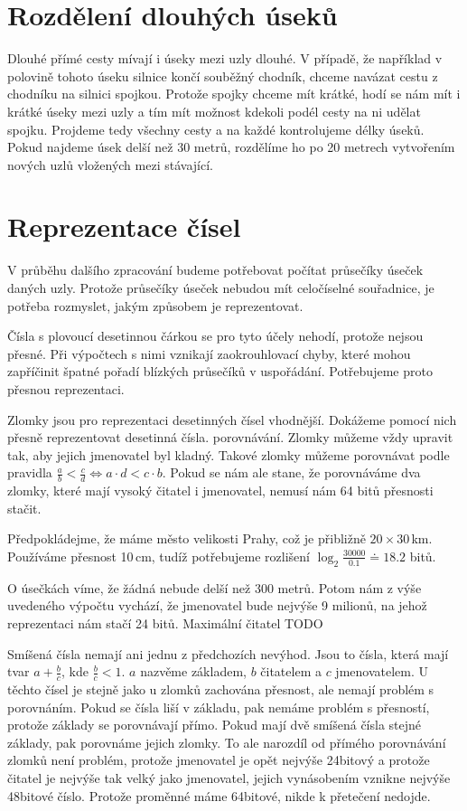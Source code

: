 \section{Rozdělení dlouhých úseků}
Dlouhé přímé cesty mívají i úseky mezi uzly dlouhé. V případě, že například v
polovině tohoto úseku silnice končí souběžný chodník, chceme navázat cestu z
chodníku na silnici spojkou. Protože spojky chceme mít krátké, hodí se nám mít i
krátké úseky mezi uzly a tím mít možnost kdekoli podél cesty na ni udělat
spojku. Projdeme tedy všechny cesty a na každé kontrolujeme délky úseků. Pokud
najdeme úsek delší než 30 metrů, rozdělíme ho po 20 metrech vytvořením nových
uzlů vložených mezi stávající.

\section{Reprezentace čísel}
V průběhu dalšího zpracování budeme potřebovat počítat průsečíky úseček daných
uzly. Protože průsečíky úseček nebudou mít celočíselné souřadnice, je potřeba
rozmyslet, jakým způsobem je reprezentovat.

{\tuc Čísla s plovoucí desetinnou čárkou} se pro tyto účely nehodí, protože
nejsou přesné. Při výpočtech s nimi vznikají zaokrouhlovací chyby, které mohou
zapříčinit špatné pořadí blízkých průsečíků v uspořádání. Potřebujeme proto
přesnou reprezentaci.

{\tuc Zlomky} jsou pro reprezentaci desetinných čísel vhodnější. Dokážeme pomocí
nich přesně reprezentovat desetinná čísla.  porovnávání. Zlomky můžeme vždy
upravit tak, aby jejich jmenovatel byl kladný.  Takové zlomky můžeme porovnávat
podle pravidla $\frac{a}{b} < \frac{c}{d} \Leftrightarrow a\cdot d < c\cdot b $. 
Pokud se nám ale stane, že porovnáváme dva zlomky, které mají vysoký čitatel i
jmenovatel, nemusí nám 64 bitů přesnosti stačit.


Předpokládejme, že máme město velikosti Prahy, což je přibližně $20 \times
30$\,km. Používáme přesnost 10\,cm, tudíž potřebujeme rozlišení $\log_2{\frac{30
000}{0.1}}\doteq18.2$ bitů. 

O úsečkách víme, že žádná nebude delší než 300 metrů. Potom nám z výše uvedeného
výpočtu vychází, že jmenovatel bude nejvýše 9 milionů, na jehož reprezentaci nám
stačí 24 bitů. Maximální čitatel TODO

{\tuc Smíšená čísla} nemají ani jednu z předchozích nevýhod. Jsou to čísla,
která mají tvar $a+\frac{b}{c}$, kde $\frac{b}{c}<1$. $a$ nazvěme základem, $b$
čitatelem a $c$ jmenovatelem. U těchto čísel je stejně jako u zlomků zachována
přesnost, ale nemají problém s porovnáním. Pokud se čísla liší v základu, pak
nemáme problém s přesností, protože základy se porovnávají přímo. Pokud mají dvě
smíšená čísla stejné základy, pak porovnáme jejich zlomky. To ale narozdíl od
přímého porovnávání zlomků není problém, protože jmenovatel je opět nejvýše
24bitový a protože čitatel je nejvýše tak velký jako jmenovatel, jejich
vynásobením vznikne nejvýše 48bitové číslo. Protože proměnné máme 64bitové,
nikde k přetečení nedojde.

